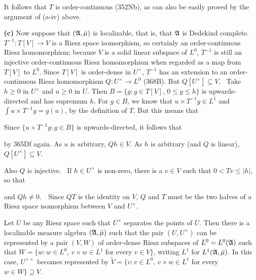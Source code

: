 {It follows that $T$ is order-continuous (352Nb), as can also be easily
proved by the argument of (a-iv) above.
     
\medskip
     
{\bf (c)} Now suppose that $(\frak A,\bar\mu)$ is localizable, that is,
that $\frak A$ is Dedekind complete.   $T^{-1}:T[V]\to V$ is a Riesz
space isomorphism, so
certainly an order-continuous Riesz homomorphism;  because $V$ is a
solid linear subspace of $L^0$, $T^{-1}$ is still an injective
order-continuous Riesz homomorphism when regarded as a map from $T[V]$
to $L^0$.   Since $T[V]$ is order-dense in $U^{\times}$, $T^{-1}$ has an
extension to an order-continuous Riesz homomorphism
$Q:U^{\times}\to L^0$ (368B).
But $Q[U^{\times}]\subseteq V$.   \Prf\ Take $h\ge 0$ in $U^{\times}$
and $u\ge 0$ in $U$.   Then $B=\{g:g\in T[V],\,0\le g\le h\}$ is
upwards-directed and has supremum $h$.   For $g\in B$, we know that
$u\times T^{-1}g\in L^1$ and $\int u\times T^{-1}g=g(u)$, by the
definition of $T$.   But this means that
     
     
\noindent Since $\{u\times T^{-1}g:g\in B\}$ is upwards-directed, it
follows that
     
     
\noindent by 365Df again.  As $u$ is arbitrary, $Qh\in V$.   As $h$
is arbitrary (and $Q$ is linear), $Q[U^{\times}]\subseteq V$.\ \Qed
     
Also $Q$ is injective.   \Prf\ If $h\in U^{\times}$ is non-zero, there
is a
$v\in V$ such that $0<Tv\le|h|$, so that
     
     
\noindent and $Qh\ne 0$.\ \QeD\   Since $QT$ is the identity on $V$, $Q$
and $T$ must be the two halves of a Riesz space isomorphism between $V$
and $U^{\times}$.
}%
     
 Let $U$ be any Riesz space such that
$U^{\times}$ separates the points of $U$.   Then there is a localizable
measure algebra $(\frak A,\bar\mu)$ such that the pair $(U,U^{\times})$
can be represented by a pair $(V,W)$ of order-dense Riesz subspaces of
$L^0=L^0(\frak A)$ such that 
$W=\{w:w\in L^0,\,v\times w\in L^1$ for every $v\in V\}$, writing $L^1$ for $L^1(\frak A,\bar\mu)$.
In this case, $U^{\times\times}$ becomes represented by $\tilde
V=\{v:v\in L^0,\,v\times w\in L^1$ for every $w\in W\}\supseteq V$.
     
